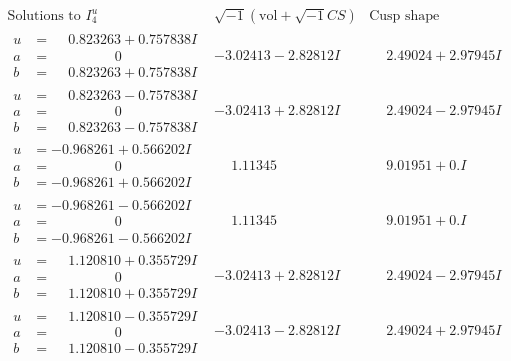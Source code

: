 \documentclass[1p]{elsarticle_modified}
\theoremstyle{definition}
\newcommand{\I}{\sqrt{-1}}
\begin{document}
$$\begin{array}{c|c|c}  
\text{Solutions to }I^u_{4}& \I (\text{vol} + \sqrt{-1}CS) & \text{Cusp shape}\\
 \hline 
\begin{aligned}
u &= \phantom{-}0.823263 + 0.757838 I \\
a &= \phantom{-0.000000 } 0 \\
b &= \phantom{-}0.823263 + 0.757838 I\end{aligned}
 & -3.02413 - 2.82812 I & \phantom{-}2.49024 + 2.97945 I \\ \hline\begin{aligned}
u &= \phantom{-}0.823263 - 0.757838 I \\
a &= \phantom{-0.000000 } 0 \\
b &= \phantom{-}0.823263 - 0.757838 I\end{aligned}
 & -3.02413 + 2.82812 I & \phantom{-}2.49024 - 2.97945 I \\ \hline\begin{aligned}
u &= -0.968261 + 0.566202 I \\
a &= \phantom{-0.000000 } 0 \\
b &= -0.968261 + 0.566202 I\end{aligned}
 & \phantom{-}1.11345\phantom{ +0.000000I} & \phantom{-}9.01951 + 0. I\phantom{ +0.000000I} \\ \hline\begin{aligned}
u &= -0.968261 - 0.566202 I \\
a &= \phantom{-0.000000 } 0 \\
b &= -0.968261 - 0.566202 I\end{aligned}
 & \phantom{-}1.11345\phantom{ +0.000000I} & \phantom{-}9.01951 + 0. I\phantom{ +0.000000I} \\ \hline\begin{aligned}
u &= \phantom{-}1.120810 + 0.355729 I \\
a &= \phantom{-0.000000 } 0 \\
b &= \phantom{-}1.120810 + 0.355729 I\end{aligned}
 & -3.02413 + 2.82812 I & \phantom{-}2.49024 - 2.97945 I \\ \hline\begin{aligned}
u &= \phantom{-}1.120810 - 0.355729 I \\
a &= \phantom{-0.000000 } 0 \\
b &= \phantom{-}1.120810 - 0.355729 I\end{aligned}
 & -3.02413 - 2.82812 I & \phantom{-}2.49024 + 2.97945 I \\ \hline\begin{aligned}

\end{aligned}
\end{array}$$
\end{document}
